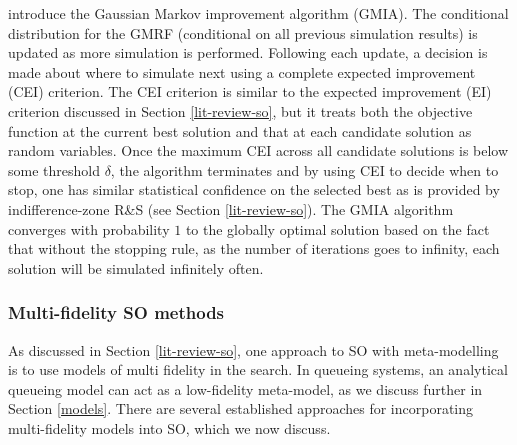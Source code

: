 \documentclass[12pt,a4paper]{article}
\begin{document}
\citet{l2019gaussian} introduce the Gaussian Markov improvement algorithm (GMIA). The conditional distribution for the GMRF (conditional on all previous simulation results) is updated as more simulation is performed. Following each update, a decision is made about where to simulate next using a complete expected improvement (CEI) criterion. The CEI criterion is similar to the expected improvement (EI) criterion discussed in Section \ref{lit-review-so}, but it treats both the objective function at the current best solution and that at each candidate solution as random variables. Once the maximum CEI across all candidate solutions is below some threshold $\delta$, the algorithm terminates and by using CEI to decide when to stop, one has similar statistical confidence on the selected best as is provided by indifference-zone R\&S (see Section \ref{lit-review-so}). The GMIA algorithm converges with probability $1$ to the globally optimal solution based on the fact that without the stopping rule, as the number of iterations goes to infinity, each solution will be simulated infinitely often.

\subsubsection{Multi-fidelity SO methods}\label{mfso-methods}

As discussed in Section \ref{lit-review-so}, one approach to SO with meta-modelling is to use models of multi fidelity in the search. In queueing systems, an analytical queueing model can act as a low-fidelity meta-model, as we discuss further in Section \ref{models}. There are several established approaches for incorporating multi-fidelity models into SO, which we now discuss.
\end{document}
